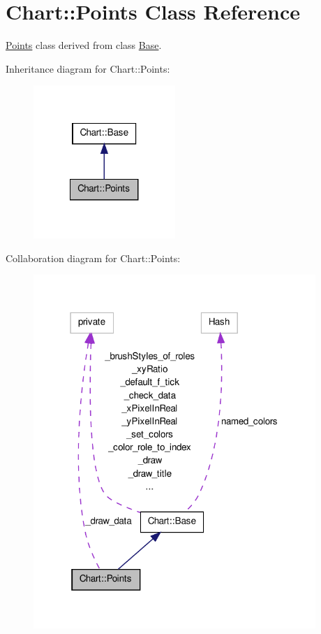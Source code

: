 \hypertarget{classChart_1_1Points}{
\section{Chart::Points Class Reference}
\label{classChart_1_1Points}
}


\hyperlink{classChart_1_1Points}{Points} class derived from class \hyperlink{classChart_1_1Base}{Base}.  




Inheritance diagram for Chart::Points:\nopagebreak
\begin{figure}[H]
\begin{center}
\leavevmode
\includegraphics[width=152pt]{classChart_1_1Points__inherit__graph}
\end{center}
\end{figure}


Collaboration diagram for Chart::Points:\nopagebreak
\begin{figure}[H]
\begin{center}
\leavevmode
\includegraphics[width=303pt]{classChart_1_1Points__coll__graph}
\end{center}
\end{figure}
